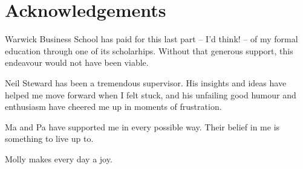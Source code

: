 
\chapter*{Acknowledgements}%
\label{cha:acknowledgements}


Warwick Business School has paid for this last part -- I'd think! --
of my formal education through one of its scholarhips. Without that generous
support, this endeavour would not have been viable.

Neil Steward has been a tremendous supervisor. His insights and ideas have
helped me move forward when I felt stuck, and his unfailing good humour and
enthusiasm have cheered me up in moments of frustration.

Ma and Pa have supported me in every possible way. Their belief in me is
something to live up to.

Molly makes every day a joy.

